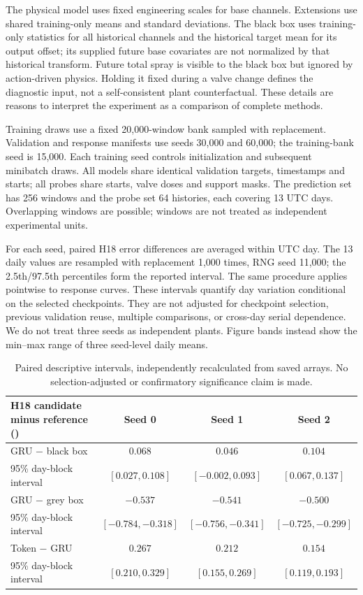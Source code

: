 The physical model uses fixed engineering scales for base channels. Extensions
use shared training-only means and standard deviations. The black box uses
training-only statistics for all historical channels and the historical target
mean for its output offset; its supplied future base covariates are not normalized
by that historical transform. Future total spray is visible to the black box but
ignored by action-driven physics. Holding it fixed during a valve change defines
the diagnostic input, not a self-consistent plant counterfactual. These details
are reasons to interpret the experiment as a comparison of complete methods.

Training draws use a fixed 20,000-window bank sampled with replacement. Validation
and response manifests use seeds 30,000 and 60,000; the training-bank seed is
15,000. Each training seed controls initialization and subsequent minibatch
draws. All models share identical validation targets, timestamps and starts;
all probes share starts, valve doses and support masks. The prediction set has
256 windows and the probe set 64 histories, each covering 13 UTC days. Overlapping
windows are possible; windows are not treated as independent experimental units.

For each seed, paired H18 error differences are averaged within UTC day.
The 13 daily values are resampled with replacement 1,000 times, RNG seed 11,000;
the 2.5th/97.5th percentiles form the reported interval. The same procedure
applies pointwise to response curves. These intervals quantify day variation
conditional on the selected checkpoints. They are not adjusted for checkpoint
selection, previous validation reuse, multiple comparisons, or cross-day serial
dependence. We do not treat three seeds as independent plants. Figure bands
instead show the min--max range of three seed-level daily means.

\begin{table}[!ht]
\centering\small
\begin{tabular}{lccc}
\toprule
H18 candidate minus reference (\degc{}) & Seed 0 & Seed 1 & Seed 2\\
\midrule
GRU $-$ black box & $0.068$ & $0.046$ & $0.104$\\
95\% day-block interval & $[0.027,0.108]$ & $[-0.002,0.093]$ & $[0.067,0.137]$\\
GRU $-$ grey box & $-0.537$ & $-0.541$ & $-0.500$\\
95\% day-block interval & $[-0.784,-0.318]$ & $[-0.756,-0.341]$ & $[-0.725,-0.299]$\\
Token $-$ GRU & $0.267$ & $0.212$ & $0.154$\\
95\% day-block interval & $[0.210,0.329]$ & $[0.155,0.269]$ & $[0.119,0.193]$\\
\bottomrule
\end{tabular}
\caption{Paired descriptive intervals, independently recalculated from saved arrays.
No selection-adjusted or confirmatory significance claim is made.}
\end{table}

